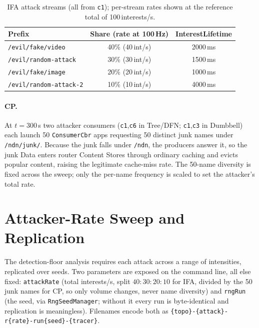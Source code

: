 \documentclass[11pt,a4paper]{article}
\begin{document}
\begin{table}[H]
\centering
\caption{IFA attack streams (all from \texttt{c1}); per-stream rates shown at the reference total of 100\,interests/s.}
\label{tab:ifa-streams}
\begin{tabular}{lcc}
\toprule
\textbf{Prefix} & \textbf{Share (rate at 100\,Hz)} & \textbf{InterestLifetime} \\
\midrule
\texttt{/evil/fake/video}      & 40\% (40\,int/s) & 2000\,ms \\
\texttt{/evil/random-attack}   & 30\% (30\,int/s) & 1500\,ms \\
\texttt{/evil/fake/image}      & 20\% (20\,int/s) & 1000\,ms \\
\texttt{/evil/random-attack-2} & 10\% (10\,int/s) & 4000\,ms \\
\bottomrule
\end{tabular}
\end{table}

\paragraph{CP.} At $t=300$\,s two attacker consumers (\texttt{c1},\texttt{c6} in Tree/DFN; \texttt{c1},\texttt{c3} in Dumbbell) each launch 50 \texttt{ConsumerCbr} apps requesting 50 distinct junk names under \texttt{/ndn/junk/}. Because the junk falls under \texttt{/ndn}, the producers answer it, so the junk Data enters router Content Stores through ordinary caching and evicts popular content, raising the legitimate cache-miss rate. The 50-name diversity is fixed across the sweep; only the per-name frequency is scaled to set the attacker's total rate.

\section{Attacker-Rate Sweep and Replication}
\label{sec:ndnsim-sweep}

The detection-floor analysis requires each attack across a range of intensities, replicated over seeds. Two parameters are exposed on the command line, all else fixed: \texttt{attackRate} (total interests/s, split $40\!:\!30\!:\!20\!:\!10$ for IFA, divided by the 50 junk names for CP, so only volume changes, never name diversity) and \texttt{rngRun} (the seed, via \texttt{RngSeedManager}; without it every run is byte-identical and replication is meaningless). Filenames encode both as \texttt{\{topo\}-\{attack\}-r\{rate\}-run\{seed\}-\{tracer\}}.
\end{document}
